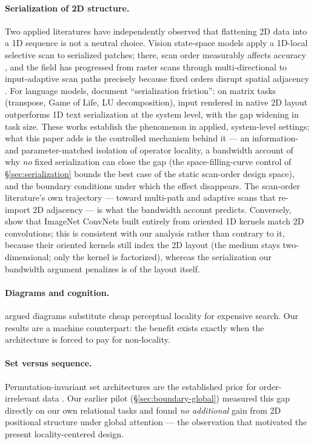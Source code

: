 \documentclass[11pt]{article}
\begin{document}
\paragraph{Serialization of 2D structure.} Two applied literatures have
independently observed that flattening 2D data into a 1D sequence is not a
neutral choice. Vision state-space models apply a 1D-local selective scan to
serialized patches; there, scan order measurably affects accuracy
\citep{hardan2025flatten}, and the field has progressed from raster scans
through multi-directional to input-adaptive scan paths precisely because
fixed orders disrupt spatial adjacency \citep{li2025damamba}. For language
models, \citet{lo2026serialization} document ``serialization friction'': on
matrix tasks (transpose, Game of Life, LU decomposition), input rendered in
native 2D layout outperforms 1D text serialization at the system level, with
the gap widening in task size. These works establish the phenomenon in
applied, system-level settings; what this paper adds is the controlled
mechanism behind it --- an information- and parameter-matched isolation of
operator locality, a bandwidth account of why \emph{no} fixed serialization
can close the gap (the space-filling-curve control of
\S\ref{sec:serialization} bounds the best case of the static scan-order
design space), and the boundary conditions under which the effect
disappears. The scan-order literature's own
trajectory --- toward multi-path and adaptive scans that re-import 2D
adjacency --- is what the bandwidth account predicts. Conversely,
\citet{kirchmeyer2023oriented} show that ImageNet ConvNets built entirely
from oriented 1D kernels match 2D convolutions; this is consistent with our
analysis rather than contrary to it, because their oriented kernels still
index the 2D layout (the medium stays two-dimensional; only the kernel is
factorized), whereas the serialization our bandwidth argument penalizes is of
the layout itself.

\paragraph{Diagrams and cognition.} \citet{larkin1987diagram} argued diagrams
substitute cheap perceptual locality for expensive search. Our results are a
machine counterpart: the benefit exists exactly when the architecture is
forced to pay for non-locality.

\paragraph{Set versus sequence.} \sloppy Permutation-invariant set
architectures are the established prior for order-irrelevant data
\citep{zaheer2017deepsets, lee2019set}. Our earlier pilot
(\S\ref{sec:boundary-global}) measured this gap directly on our own
relational tasks and found \emph{no additional} gain from 2D positional
structure under global attention --- the observation that motivated the
present locality-centered design.\par\fussy
\end{document}
